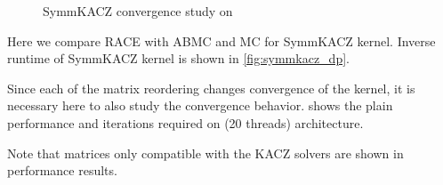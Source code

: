 \begin{figure}[thbp]
	\centering
	\hspace{1em}
	\caption{\acrshort{SymmKACZ} convergence study on \SKX}
	\label{fig:symmkacz_convergence}
\end{figure}
Here we compare  \acrshort{RACE} with \acrshort{ABMC} and \acrshort{MC} for \acrshort{SymmKACZ} kernel. Inverse runtime of \acrshort{SymmKACZ} kernel is shown in \cref{fig:symmkacz_dp}.

 Since each of the matrix reordering changes convergence of the kernel, it is necessary here to also study the convergence behavior.  shows the plain performance and iterations required on \SKX (20 threads) architecture.

Note that matrices only compatible with the \acrshort{KACZ} solvers are shown in performance results.

